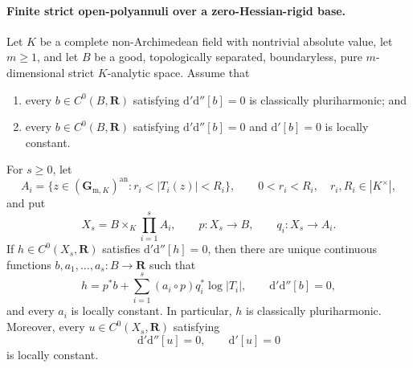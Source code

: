 \paragraph{Finite strict open-polyannuli over a zero-Hessian-rigid base.}
\begin{proposition}
\label{prop:p062-open-polyannulus-rigid-base}
Let \(K\) be a complete non-Archimedean field with nontrivial absolute
value, let \(m\geq1\), and let \(B\) be a good, topologically separated,
boundaryless, pure \(m\)-dimensional strict \(K\)-analytic space.  Assume
that
\begin{enumerate}
\item every \(b\in C^0(B,\mathbf R)\) satisfying
  \(\mathrm d'\mathrm d''[b]=0\) is classically pluriharmonic; and
\item every \(b\in C^0(B,\mathbf R)\) satisfying
  \(\mathrm d'\mathrm d''[b]=0\) and \(\mathrm d'[b]=0\) is locally
  constant.
\end{enumerate}
For \(s\geq0\), let
\[
 A_i=\{z\in(\mathbf G_{\mathrm m,K})^{\mathrm{an}}:
                     r_i<|T_i(z)|<R_i\},
 \qquad 0<r_i<R_i,\quad r_i,R_i\in|K^\times|,
\]
and put
\[
 X_s=B\times_K\prod_{i=1}^sA_i,
 \qquad p:X_s\longrightarrow B,
 \qquad q_i:X_s\longrightarrow A_i.
\]
If \(h\in C^0(X_s,\mathbf R)\) satisfies
\(\mathrm d'\mathrm d''[h]=0\), then there are unique continuous
functions \(b,a_1,\ldots,a_s:B\to\mathbf R\) such that
\[
 h=p^*b+\sum_{i=1}^s(a_i\circ p)q_i^*\log|T_i|,
 \qquad \mathrm d'\mathrm d''[b]=0,
\]
and every \(a_i\) is locally constant.  In particular, \(h\) is
classically pluriharmonic.  Moreover, every
\(u\in C^0(X_s,\mathbf R)\) satisfying
\[
             \mathrm d'\mathrm d''[u]=0,
             \qquad \mathrm d'[u]=0
\]
is locally constant.
\end{proposition}

